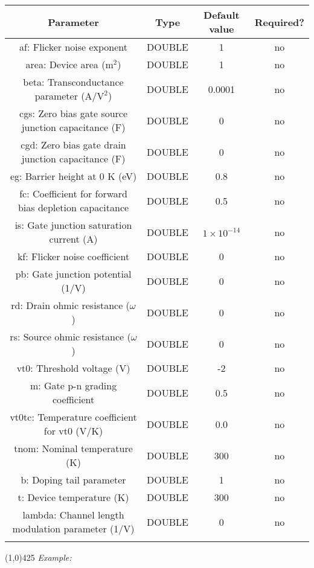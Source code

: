 \documentclass{article}
\begin{document}
\begin{table}[H]
\begin{tabular}{|c|c|c|c|}
\hline
Parameter&Type&Default value&Required?\\
\hline
af: Flicker noise exponent & DOUBLE & 1 & no\\
\hline
area: Device area ($\textrm{m}^2$) & DOUBLE & 1 & no\\
\hline
beta: Transconductance parameter ($\textrm{A}/\textrm{V}^2$)& DOUBLE & 0.0001 & no\\
\hline
cgs: Zero bias gate source junction capacitance (F) & DOUBLE & 0 & no\\
\hline
cgd: Zero bias gate drain junction capacitance (F)& DOUBLE & 0 & no\\
\hline
eg: Barrier height at 0 K (eV) & DOUBLE & 0.8 & no\\
\hline
fc: Coefficient for forward bias depletion capacitance & DOUBLE & 0.5 & no\\
\hline
is: Gate junction saturation current (A)& DOUBLE & $1\times10^{-14}$ & no\\
\hline
kf: Flicker noise coefficient & DOUBLE & 0 & no\\
\hline
pb: Gate junction potential (1/V)& DOUBLE & 0 & no\\
\hline
rd: Drain ohmic resistance ($\omega$)& DOUBLE & 0 & no\\
\hline
rs: Source ohmic resistance ($\omega$) & DOUBLE & 0 & no\\
\hline
vt0: Threshold voltage (V)& DOUBLE & -2 & no\\
\hline
m: Gate p-n grading coefficient & DOUBLE & 0.5 & no\\
\hline
vt0tc: Temperature coefficient for vt0 (V/K) & DOUBLE & 0.0 & no\\
\hline
tnom: Nominal temperature (K)& DOUBLE & 300 & no\\
\hline
b: Doping tail parameter & DOUBLE & 1 & no\\
\hline
t: Device temperature (K) & DOUBLE & 300 & no\\
\hline
lambda: Channel length modulation parameter (1/V) & DOUBLE & 0 & no\\
\par
\hline
\end{tabular}
\end{table}
\noindent\linethickness{0.5mm}\line(1,0){425}
\newline
\textit{Example:}
\newline
\end{document}
